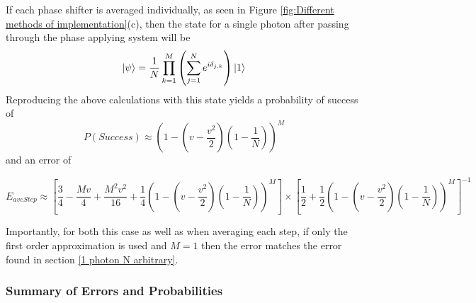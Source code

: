 \documentclass[aps,pra,twocolumn,superscriptaddress,numerical,floatfix]{revtex4-1}
\begin{document}
If each phase shifter is averaged individually, as seen in Figure \ref{fig:Different methods of implementation}(c), then the state for a single photon after passing through the phase applying system will be
\begin{equation}
	\ket{\psi}=\frac{1}{N}\prod_{k=1}^{M}\left(\sum_{j=1}^{N}e^{i\delta_{j,k}}\right)\ket{1}\label{eq:AveStepPhaseState}
\end{equation}
Reproducing the above calculations with this state yields a probability of success of
\begin{equation}
P\left(Success\right)\approx\left(1-\left(v-\frac{v^{2}}{2}\right)\left(1-\frac{1}{N}\right)\right)^{M}\label{eq:AvStepProbSuccess}
\end{equation}
and an error of
\begin{widetext}
\begin{equation}
E_{aveStep} \approx  \left[\frac{3}{4}-\frac{Mv}{4}+\frac{M^{2}v^{2}}{16}+\frac{1}{4}\left(1-\left(v-\frac{v^{2}}{2}\right)\left(1-\frac{1}{N}\right)\right)^{M}\right]\nonumber\times\left[\frac{1}{2}+\frac{1}{2}\left(1-\left(v-\frac{v^{2}}{2}\right)\left(1-\frac{1}{N}\right)\right)^{M}\right]^{-1}\label{eq:ErrorAvStep}
\end{equation}
\end{widetext}
Importantly, for both this case as well as when averaging each step, if only the first order approximation is used and $M=1$ then the error matches the error found in section \ref{1 photon N arbitrary}.

\subsubsection{Summary of Errors and Probabilities\label{Summary of Errors and Probabilities}}
\end{document}
